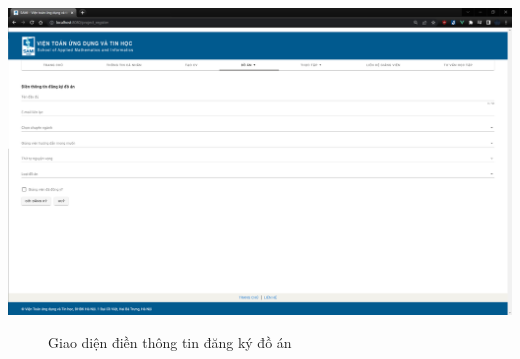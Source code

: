     \begin{center}
      \includegraphics[width=1\textwidth]{./image/design/student/project.png}
      \begin{figure}[h]
        \centering
        \caption{Giao diện điền thông tin đăng ký đồ án}
      \end{figure}
    \end{center}
